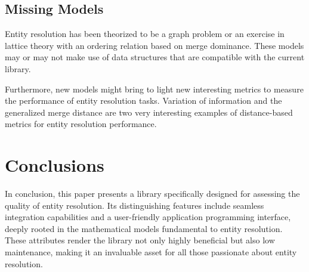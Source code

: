 \documentclass[11pt]{article}
\begin{document}
    \subsection{Missing Models}

    Entity resolution has been theorized to be a graph problem\cite{eager2021}
    or an exercise in lattice theory with an ordering relation based on merge
    dominance\cite{Ben2009Swoosh}.
    These models may or may not make use of data structures that are compatible
    with the current library.

    Furthermore, new models might bring to light new interesting metrics to
    measure the performance of entity resolution tasks.
    Variation of information\cite{meila2007vi} and the generalized merge
    distance\cite{Men10} are two very interesting examples of distance-based
    metrics for entity resolution performance.

    \section{Conclusions}\label{sec:conclusions}

    In conclusion, this paper presents a library specifically designed for
    assessing the quality of entity resolution.
    Its distinguishing features include seamless integration capabilities and a
    user-friendly application programming interface, deeply rooted in the
    mathematical models fundamental to entity resolution.
    These attributes render the library not only highly beneficial but also low
    maintenance, making it an invaluable asset for all those passionate about
    entity resolution.

    
\end{document}
